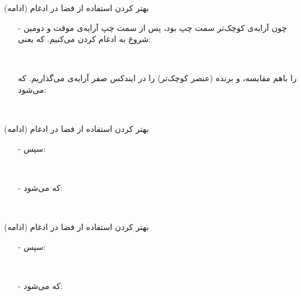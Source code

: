 \begin{frame}{بهتر کردن استفاده از فضا در ادغام (ادامه)}
\begin{itemize}\itemr
\item[-]
چون آرایه‌ی کوچک‌تر سمت چپ بود، پس از سمت چپ‌ آرایه‌ی موقت و دومین  شروع به ادغام کردن می‌کنیم. که یعنی:
\begin{lfl}
\\
\end{lfl}
را باهم مقایسه، و برنده (عنصر کوچک‌تر) را در ایندکس صفر آرایه‌ی  می‌گذاریم. که می‌شود:

\begin{lfl}
\\
\end{lfl}
\end{itemize}
\end{frame}

\begin{frame}{بهتر کردن استفاده از فضا در ادغام (ادامه)}
\begin{itemize}\itemr
\item[-]
سپس:
\begin{lfl}
\\
\end{lfl}

\item[-]
که می‌شود:
\begin{lfl}
\\
\end{lfl}
\end{itemize}
\end{frame}

\begin{frame}{بهتر کردن استفاده از فضا در ادغام (ادامه)}
\begin{itemize}\itemr
\item[-]
سپس:
\begin{lfl}
\\
\end{lfl}

\item[-]
که می‌شود:
\begin{lfl}
\\
\end{lfl}
\end{itemize}
\end{frame}
